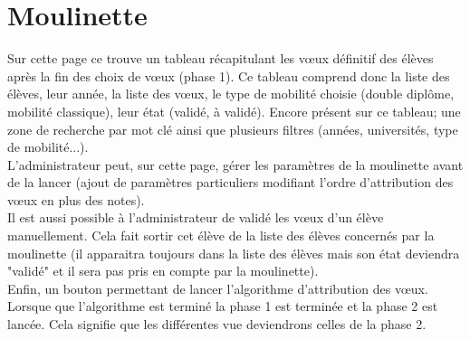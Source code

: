 \section{Moulinette}

Sur cette page ce trouve un tableau récapitulant les vœux définitif des élèves après la fin des choix de vœux (phase 1). Ce tableau comprend donc la liste des élèves, leur année, la liste des vœux, le type de mobilité choisie (double diplôme, mobilité classique), leur état (validé, à validé).
Encore présent sur ce tableau; une zone de recherche par mot clé ainsi que plusieurs filtres (années, universités, type de mobilité...).\\

L'administrateur peut, sur cette page, gérer les paramètres de la moulinette avant de la lancer (ajout de paramètres particuliers modifiant l'ordre d'attribution des vœux en plus des notes).\\

Il est aussi possible à l'administrateur de validé les vœux d'un élève manuellement. Cela fait sortir cet élève de la liste des élèves concernés par la moulinette (il apparaitra toujours dans la liste des élèves mais son état deviendra "validé" et il sera pas pris en compte par la moulinette).\\

Enfin, un bouton permettant de lancer l'algorithme d'attribution des vœux. Lorsque que l'algorithme est terminé la phase 1 est terminée et la phase 2 est lancée. Cela signifie que les différentes vue deviendrons celles de la phase 2.
